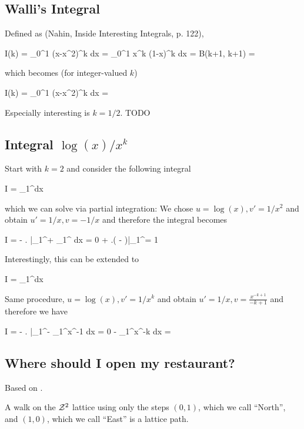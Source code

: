 \subsection{Walli's Integral}

Defined as (Nahin, Inside Interesting Integrals, p. 122),

\bee
I(k) = \int_0^1 (x-x^2)^k dx = \int_0^1 x^k (1-x)^k dx = B(k+1, k+1) = 
\eee

which becomes (for integer-valued $k$)

\bee
I(k) = \int_0^1 (x-x^2)^k dx = 
\eee

Especially interesting is $k =1/2$. TODO


\subsection{Integral $\log(x)/x^k$}

Start with $k = 2$ and consider the following integral

\bee
I = \int_1^\infty {}dx
\eee

which we can solve via partial integration: We chose $u=\log(x), v'=1/x^2$ and obtain $u' = 1/x, v = -1/x$ and therefore the integral becomes

\bee
I = - \left.  \right|_1^\infty + \int_1^\infty {} dx = 0 + \left.\left( -  \right)\right|_1^\infty = 1
\eee

Interestingly, this can be extended to

\bee
I = \int_1^\infty {}dx
\eee

Same procedure, $u=\log(x), v'=1/x^k$ and obtain $u' = 1/x, v = \frac{x^{-k+1}}{-k+1}$ and therefore we have

\bee
I = - \left.  \right|_1^\infty - \int_1^\infty x^{-1}  dx = 0 -  \int_1^\infty x^{-k} dx = 
\eee

\subsection{Where should I open my restaurant?}

Based on \cite{Kaplan2017}.

A walk on the $\mathcal{Z}^2$ lattice using only the steps $(0, 1)$, which we call ``North'', and $(1, 0)$, which we call ``East'' is a lattice path.

